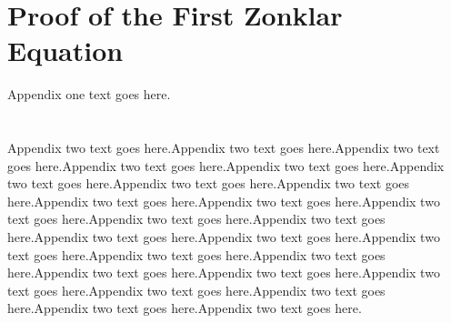 \documentclass[10pt,journal,cspaper,compsoc]{IEEEtran}
\begin{document}

%


\appendices
\section{Proof of the First Zonklar Equation}
Appendix one text goes here.

\section{}
Appendix two text goes here.Appendix two text goes here.Appendix two text goes here.Appendix two text goes here.Appendix two text goes here.Appendix two text goes here.Appendix two text goes here.Appendix two text goes here.Appendix two text goes here.Appendix two text goes here.Appendix two text goes here.Appendix two text goes here.Appendix two text goes here.Appendix two text goes here.Appendix two text goes here.Appendix two text goes here.Appendix two text goes here.Appendix two text goes here.Appendix two text goes here.Appendix two text goes here.Appendix two text goes here.Appendix two text goes here.Appendix two text goes here.Appendix two text goes here.Appendix two text goes here.
\end{document}
